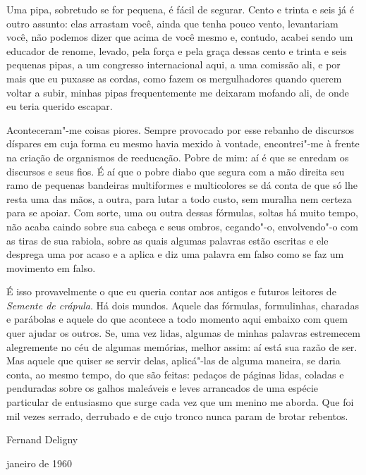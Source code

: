 Uma pipa, sobretudo se for pequena, é fácil de segurar. Cento e trinta e
seis já é outro assunto: elas arrastam você, ainda que tenha pouco
vento, levantariam você, não podemos dizer que acima de você mesmo e,
contudo, acabei sendo um educador de renome, levado, pela força e pela
graça dessas cento e trinta e seis pequenas pipas, a um congresso
internacional aqui, a uma comissão ali, e por mais que eu puxasse as
cordas, como fazem os mergulhadores quando querem voltar a subir, minhas
pipas frequentemente me deixaram mofando ali, de onde eu teria querido
escapar.

Aconteceram"-me coisas piores. Sempre provocado por esse rebanho de
discursos díspares em cuja forma eu mesmo havia mexido à vontade,
encontrei"-me à frente na criação de organismos de reeducação. Pobre de
mim: aí é que se enredam os discursos e seus fios. É aí que o pobre
diabo que segura com a mão direita seu ramo de pequenas bandeiras
multiformes e multicolores se dá conta de que só lhe resta uma das mãos,
a outra, para lutar a todo custo, sem muralha nem certeza para se
apoiar. Com sorte, uma ou outra dessas fórmulas, soltas há muito tempo,
não acaba caindo sobre sua cabeça e seus ombros, cegando"-o, envolvendo"-o
com as tiras de sua rabiola, sobre as quais algumas palavras estão
escritas e ele desprega uma por acaso e a aplica e diz uma palavra em
falso como se faz um movimento em falso.

É isso provavelmente o que eu queria contar aos antigos e futuros
leitores de \emph{Semente de crápula}. Há dois mundos. Aquele das
fórmulas, formulinhas, charadas e parábolas e aquele do que acontece a
todo momento aqui embaixo com quem quer ajudar os outros. Se, uma vez
lidas, algumas de minhas palavras estremecem alegremente no céu de
algumas memórias, melhor assim: aí está sua razão de ser. Mas aquele que
quiser se servir delas, aplicá"-las de alguma maneira, se daria conta, ao
mesmo tempo, do que são feitas: pedaços de páginas lidas, coladas e
penduradas sobre os galhos maleáveis e leves arrancados de uma espécie
particular de entusiasmo que surge cada vez que um menino me aborda. Que
foi mil vezes serrado, derrubado e de cujo tronco nunca param de brotar
rebentos.

\hfill{}Fernand Deligny

\hfill{}janeiro de 1960
